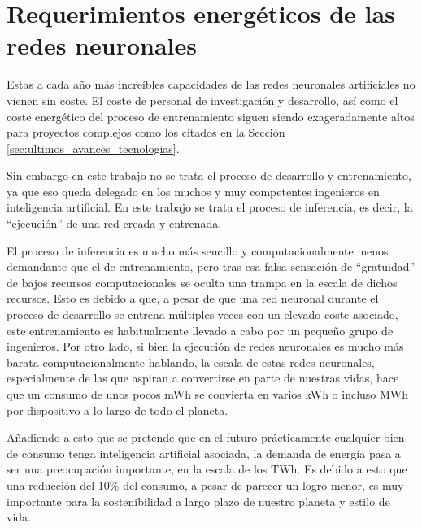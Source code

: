 \section{Requerimientos energéticos de las redes neuronales}
\label{sec:requerimientos_energeticos_redes_neuronales}
Estas a cada año más increíbles capacidades de las redes neuronales artificiales no vienen sin coste. El coste de personal de investigación y desarrollo, así como el coste energético del proceso de entrenamiento siguen siendo exageradamente altos para proyectos complejos como los citados en la Sección \ref{sec:ultimos_avances_tecnologias}.

Sin embargo en este trabajo no se trata el proceso de desarrollo y entrenamiento, ya que eso queda delegado en los muchos y muy competentes ingenieros en inteligencia artificial. En este trabajo se trata el proceso de inferencia, es decir, la ``ejecución'' de una red creada y entrenada.

El proceso de inferencia es mucho más sencillo y computacionalmente menos demandante que el de entrenamiento, pero tras esa falsa sensación de ``gratuidad'' de bajos recursos computacionales se oculta una trampa en la escala de dichos recursos. Esto es debido a que, a pesar de que una red neuronal durante el proceso de desarrollo se entrena múltiples veces con un elevado coste asociado, este entrenamiento es habitualmente llevado a cabo por un pequeño grupo de ingenieros. Por otro lado, si bien la ejecución de redes neuronales es mucho más barata computacionalmente hablando, la escala de estas redes neuronales, especialmente de las que aspiran a convertirse en parte de nuestras vidas, hace que un consumo de unos pocos mWh se convierta en varios kWh o incluso MWh por dispositivo a lo largo de todo el planeta.

Añadiendo a esto que se pretende que en el futuro prácticamente cualquier bien de consumo tenga inteligencia artificial asociada, la demanda de energía pasa a ser una preocupación importante, en la escala de los TWh. Es debido a esto que una reducción del 10\% del consumo, a pesar de parecer un logro menor, es muy importante para la sostenibilidad a largo plazo de nuestro planeta y estilo de vida.

